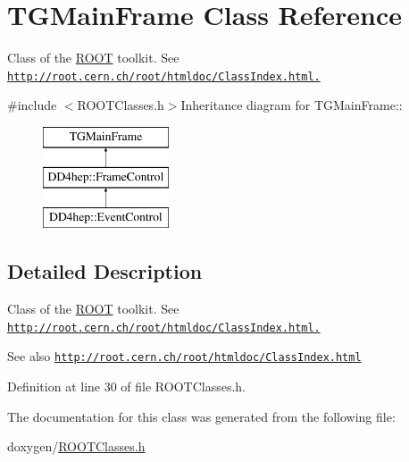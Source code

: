 \hypertarget{class_t_g_main_frame}{
\section{TGMainFrame Class Reference}
\label{class_t_g_main_frame}
}


Class of the \hyperlink{namespace_r_o_o_t}{ROOT} toolkit. See \href{http://root.cern.ch/root/htmldoc/ClassIndex.html.}{\tt http://root.cern.ch/root/htmldoc/ClassIndex.html.}  


{\ttfamily \#include $<$ROOTClasses.h$>$}Inheritance diagram for TGMainFrame::\begin{figure}[H]
\begin{center}
\leavevmode
\includegraphics[height=3cm]{class_t_g_main_frame}
\end{center}
\end{figure}


\subsection{Detailed Description}
Class of the \hyperlink{namespace_r_o_o_t}{ROOT} toolkit. See \href{http://root.cern.ch/root/htmldoc/ClassIndex.html.}{\tt http://root.cern.ch/root/htmldoc/ClassIndex.html.} \begin{DoxySeeAlso}{See also}
\href{http://root.cern.ch/root/htmldoc/ClassIndex.html}{\tt http://root.cern.ch/root/htmldoc/ClassIndex.html} 
\end{DoxySeeAlso}


Definition at line 30 of file ROOTClasses.h.

The documentation for this class was generated from the following file:\begin{DoxyCompactItemize}
\item 
doxygen/\hyperlink{_r_o_o_t_classes_8h}{ROOTClasses.h}\end{DoxyCompactItemize}
